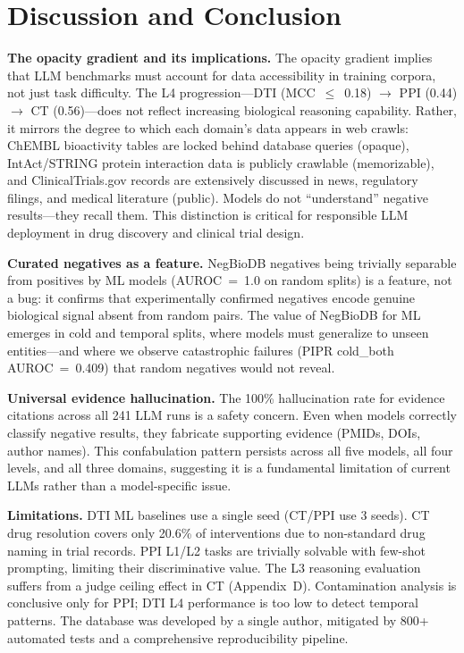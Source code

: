 \section{Discussion and Conclusion}
\label{sec:discussion}

\textbf{The opacity gradient and its implications.}
The opacity gradient implies that LLM benchmarks must account for data accessibility in training corpora, not just task difficulty. The L4 progression---DTI (MCC~$\leq$~0.18) $\to$ PPI (0.44) $\to$ CT (0.56)---does not reflect increasing biological reasoning capability. Rather, it mirrors the degree to which each domain's data appears in web crawls: ChEMBL bioactivity tables are locked behind database queries (opaque), IntAct/STRING protein interaction data is publicly crawlable (memorizable), and ClinicalTrials.gov records are extensively discussed in news, regulatory filings, and medical literature (public). Models do not ``understand'' negative results---they recall them. This distinction is critical for responsible LLM deployment in drug discovery and clinical trial design.

\textbf{Curated negatives as a feature.}
NegBioDB negatives being trivially separable from positives by ML models (AUROC~=~1.0 on random splits) is a feature, not a bug: it confirms that experimentally confirmed negatives encode genuine biological signal absent from random pairs. The value of NegBioDB for ML emerges in cold and temporal splits, where models must generalize to unseen entities---and where we observe catastrophic failures (PIPR cold\_both AUROC~=~0.409) that random negatives would not reveal.

\textbf{Universal evidence hallucination.}
The 100\% hallucination rate for evidence citations across all 241 LLM runs is a safety concern. Even when models correctly classify negative results, they fabricate supporting evidence (PMIDs, DOIs, author names). This confabulation pattern persists across all five models, all four levels, and all three domains, suggesting it is a fundamental limitation of current LLMs rather than a model-specific issue.

\textbf{Limitations.}
DTI ML baselines use a single seed (CT/PPI use 3 seeds). CT drug resolution covers only 20.6\% of interventions due to non-standard drug naming in trial records. PPI L1/L2 tasks are trivially solvable with few-shot prompting, limiting their discriminative value. The L3 reasoning evaluation suffers from a judge ceiling effect in CT (Appendix~D). Contamination analysis is conclusive only for PPI; DTI L4 performance is too low to detect temporal patterns. The database was developed by a single author, mitigated by 800+ automated tests and a comprehensive reproducibility pipeline.

